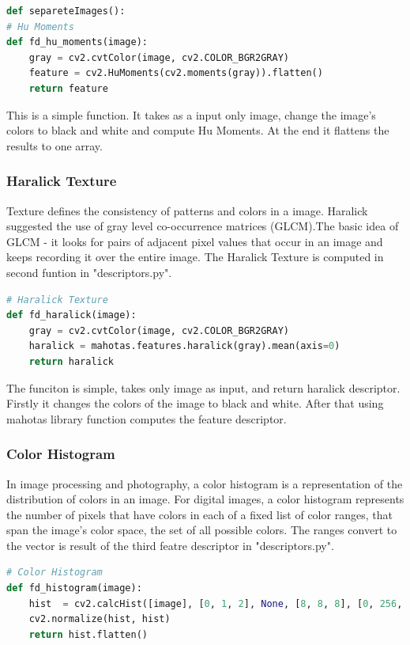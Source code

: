 \documentclass[12pt]{article}
\begin{document}
\begin{lstlisting}[language=Python]
def separeteImages():
# Hu Moments
def fd_hu_moments(image):
    gray = cv2.cvtColor(image, cv2.COLOR_BGR2GRAY)
    feature = cv2.HuMoments(cv2.moments(gray)).flatten()
    return feature
\end{lstlisting} 

This is a simple function. It takes as a input only image, change the image's colors to black and white and compute Hu Moments. At the end it flattens the results to one array.

\subsubsection{Haralick Texture}

Texture defines the consistency of patterns and colors in a image. Haralick suggested the use of gray level co-occurrence matrices (GLCM).The basic idea of GLCM - it looks for pairs of adjacent pixel values that occur in an image and keeps recording it over the entire image. The Haralick Texture is computed in second funtion in "descriptors.py".

\begin{lstlisting}[language=Python]
# Haralick Texture
def fd_haralick(image):
    gray = cv2.cvtColor(image, cv2.COLOR_BGR2GRAY)
    haralick = mahotas.features.haralick(gray).mean(axis=0)
    return haralick
\end{lstlisting} 

The funciton is simple, takes only image as input, and return haralick descriptor. Firstly it changes the colors of the image to black and white. After that using mahotas library function computes the feature descriptor.

\subsubsection{Color Histogram}

In image processing and photography, a color histogram is a representation of the distribution of colors in an image. For digital images, a color histogram represents the number of pixels that have colors in each of a fixed list of color ranges, that span the image's color space, the set of all possible colors. The ranges convert to the vector is result of the third featre descriptor in "descriptors.py".

\begin{lstlisting}[language=Python]
# Color Histogram
def fd_histogram(image):
    hist  = cv2.calcHist([image], [0, 1, 2], None, [8, 8, 8], [0, 256, 0, 256, 0, 256])
    cv2.normalize(hist, hist)
    return hist.flatten()
\end{lstlisting} 
\end{document}
